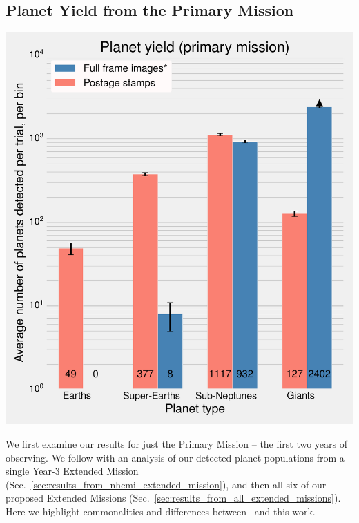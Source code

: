 \subsection{Planet Yield from the Primary Mission}
\label{sec:results_from_primary_missions}
\begin{marginfigure} %
	\centering
	\includegraphics[width=\textwidth]{figures/160729_pm0_shemi_nhemi_nhemi_t50-pri_bar_chart.pdf}
	\caption{Mean numbers of planets detected in \tesss Primary Mission.
	The number of Earths ($R_p < 1.25R_\oplus$), super-Earths ($1.25R_\oplus \le R_p < 2R_\oplus$), sub-Neptunes ($2R_\oplus \le R_p < 4R_\oplus$) and giants agree with the respective values quoted in \protect\citet{Sullivan_2015} to $\lesssim 50\%$. 
	Our full frame images detections are complete for $R_p < 4R_\oplus$, and 
	incomplete for giant ($R_p > 4R_\oplus$) planets, shown with a lower limit 
	(see text for discussion). 
	Error bars are from only Poisson fluctuations and do not account for systematic uncertainty.}
	\label{fig:primary_planet_yield}
\end{marginfigure}
We first examine our results for just the Primary Mission -- the first two years of \tesss observing. 
We follow with an analysis of our detected planet populations from a single Year-3 Extended Mission (Sec.~\ref{sec:results_from_nhemi_extended_mission}), and then all six of our proposed Extended Missions (Sec.~\ref{sec:results_from_all_extended_missions}).
Here we highlight commonalities and differences between~ and this work.


